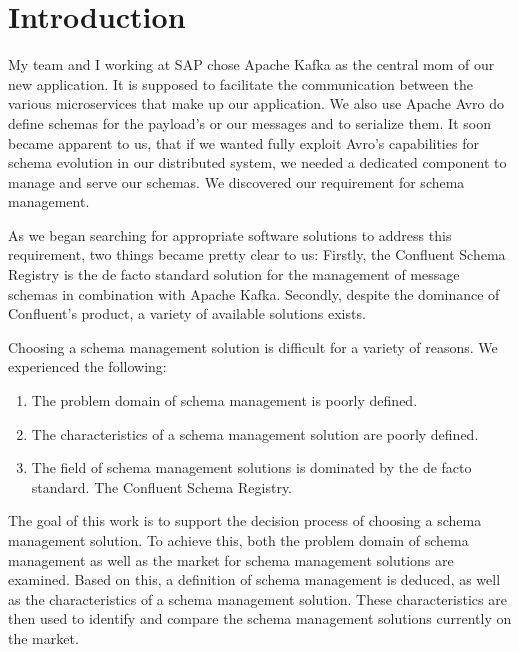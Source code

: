 
\section{Introduction}\label{sec:introduction}

My team and I working at SAP chose Apache Kafka as the central \gls{mom} of our new application.
It is supposed to facilitate the communication between the various microservices that make up our application.
We also use Apache Avro do define schemas for the payload's or our messages and to serialize them.
It soon became apparent to us, that if we wanted fully exploit Avro's capabilities for schema evolution in our distributed system, we needed a dedicated component to manage and serve our schemas.
We discovered our requirement for schema management.

As we began searching for appropriate software solutions to address this requirement, two things became pretty clear to us: Firstly, the Confluent Schema Registry is the de facto standard solution for the management of message schemas in combination with Apache Kafka. Secondly, despite the dominance of Confluent's product, a variety of available solutions exists.

Choosing a schema management solution is difficult for a variety of reasons. We experienced the following:

\begin{enumerate}
  \item The problem domain of schema management is poorly defined.
  \item The characteristics of a schema management solution are poorly defined.
  \item The field of schema management solutions is dominated by the de facto standard. The Confluent Schema Registry.
\end{enumerate}

The goal of this work is to support the decision process of choosing a schema management solution.
To achieve this, both the problem domain of schema management as well as the market for schema management solutions are examined.
Based on this, a definition of schema management is deduced, as well as the characteristics of a schema management solution.
These characteristics are then used to identify and compare the schema management solutions currently on the market.

